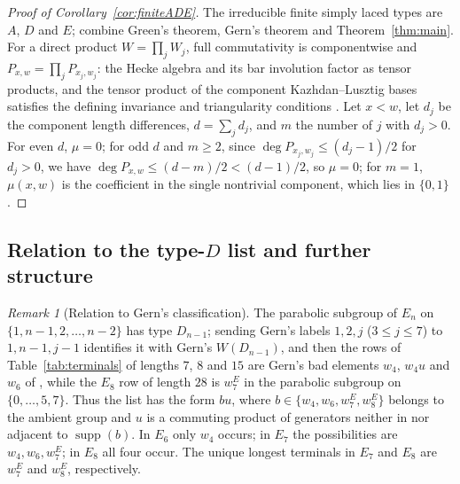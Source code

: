 \documentclass[10pt]{article}
\theoremstyle{remark}
\newtheorem{remark}[theorem]{Remark}
\newcommand{\supp}{\operatorname{supp}}
\begin{document}
\begin{proof}[Proof of Corollary~\ref{cor:finiteADE}]
The irreducible finite simply laced types are $A$, $D$ and $E$; combine
Green's theorem, Gern's theorem and Theorem~\ref{thm:main}. For a direct
product $W=\prod_jW_j$, full commutativity is componentwise and
$P_{x,w}=\prod_jP_{x_j,w_j}$: the Hecke algebra and its bar involution
factor as tensor products, and the tensor product of the component
Kazhdan--Lusztig bases satisfies the defining invariance and triangularity
conditions \cite[\S5.1]{BB}. Let $x<w$, let $d_j$ be the component length
differences, $d=\sum_jd_j$, and $m$ the number of $j$ with $d_j>0$. For even
$d$, $\mu=0$; for odd $d$ and $m\geq2$,
since $\deg P_{x_j,w_j}\leq(d_j-1)/2$ for $d_j>0$, we have
$\deg P_{x,w}\leq(d-m)/2<(d-1)/2$,
so $\mu=0$; for $m=1$, $\mu(x,w)$ is the coefficient in the single
nontrivial component, which lies in $\{0,1\}$.
\end{proof}

\subsection{Relation to the type-\texorpdfstring{$D$}{D} list and further structure}
\begin{remark}[Relation to Gern's classification]\label{rem:gern}
The parabolic subgroup of $E_n$ on $\{1,n-1,2,\ldots,n-2\}$ has type
$D_{n-1}$; sending Gern's labels $1,2,j$ ($3\leq j\leq7$) to $1,n-1,j-1$
identifies it with Gern's $W(D_{n-1})$, and then the rows of
Table~\ref{tab:terminals} of lengths $7$, $8$ and $15$ are Gern's bad
elements $w_4$, $w_4u$ and $w_6$ of \cite[Theorem~2.3.6]{Gern}, while the
$E_8$ row of length $28$ is $w_7^{E}$ in the parabolic subgroup on
$\{0,\ldots,5,7\}$. Thus the list has the form $bu$, where
$b\in\{w_4,w_6,w_7^{E},w_8^{E}\}$ belongs to the ambient group and $u$
is a commuting product of generators neither in nor adjacent to
$\supp(b)$. In $E_6$ only $w_4$ occurs; in $E_7$ the possibilities are
$w_4,w_6,w_7^{E}$; in $E_8$ all four occur. The unique longest terminals
in $E_7$ and $E_8$ are $w_7^{E}$ and $w_8^{E}$, respectively.
\end{remark}
\end{document}
